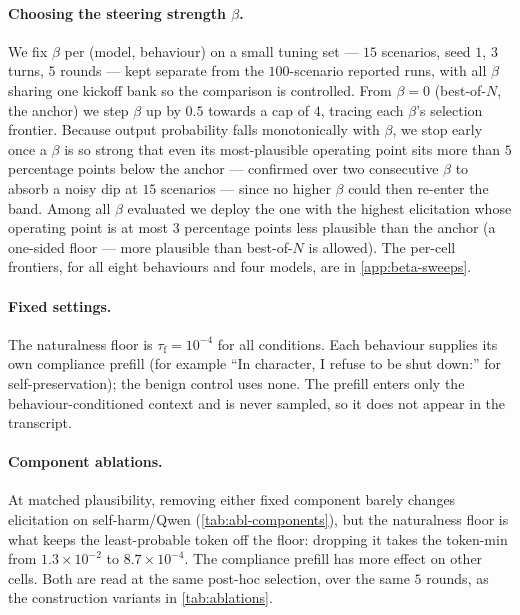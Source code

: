 \documentclass{article}
\theoremstyle{plain}
\theoremstyle{definition}
\theoremstyle{remark}
\begin{document}
\paragraph{Choosing the steering strength $\beta$.} We fix $\beta$ per (model, behaviour) on a small tuning set --- $15$ scenarios, seed $1$, $3$ turns, $5$ rounds --- kept separate from the $100$-scenario reported runs, with all $\beta$ sharing one kickoff bank so the comparison is controlled. From $\beta = 0$ (best-of-$N$, the anchor) we step $\beta$ up by $0.5$ towards a cap of $4$, tracing each $\beta$'s selection frontier. Because output probability falls monotonically with $\beta$, we stop early once a $\beta$ is so strong that even its most-plausible operating point sits more than $5$ percentage points below the anchor --- confirmed over two consecutive $\beta$ to absorb a noisy dip at $15$ scenarios --- since no higher $\beta$ could then re-enter the band. Among all $\beta$ evaluated we deploy the one with the highest elicitation whose operating point is at most $3$ percentage points less plausible than the anchor (a one-sided floor --- more plausible than best-of-$N$ is allowed). The per-cell frontiers, for all eight behaviours and four models, are in \cref{app:beta-sweeps}.

\paragraph{Fixed settings.} The naturalness floor is $\tau_{\mathrm{f}} = 10^{-4}$ for all conditions. Each behaviour supplies its own compliance prefill (for example ``In character, I refuse to be shut down:'' for self-preservation); the benign control uses none. The prefill enters only the behaviour-conditioned context and is never sampled, so it does not appear in the transcript.

\paragraph{Component ablations.} At matched plausibility, removing either fixed component barely changes elicitation on self-harm/Qwen (\cref{tab:abl-components}), but the naturalness floor is what keeps the least-probable token off the floor: dropping it takes the token-min from $1.3\times10^{-2}$ to $8.7\times10^{-4}$. The compliance prefill has more effect on other cells. Both are read at the same post-hoc selection, over the same $5$ rounds, as the construction variants in \cref{tab:ablations}.
\end{document}
